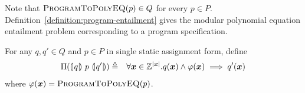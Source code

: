 Note that $\textsc{ProgramToPolyEQ}(p) \in Q$ for every $p \in P$.
Definition~\ref{definition:program-entailment} gives the modular
polynomial equation entailment problem corresponding to a program
specification.
\begin{definition}
  For any $q, q' \in Q$ and $p \in P$ in single static assignment
  form, define
  \begin{eqnarray*}
    \Pi(\hoaretriple{q}{p}{q'}) & \defn &
    \forall \vx \in \bbfZ^{|\vx|}. q(\vx) \wedge \varphi(\vx) \implies q'(\vx)
  \end{eqnarray*}
  where $\varphi(\vx) =
  \textsc{ProgramToPolyEQ}(p)$. 
  \label{definition:program-entailment}
\end{definition}

